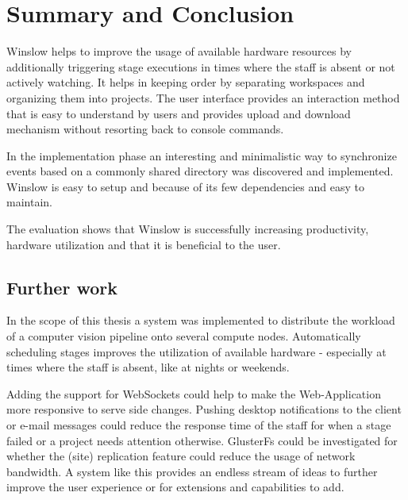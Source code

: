 \chapter{Summary and Conclusion}

Winslow helps to improve the usage of available hardware resources by additionally triggering stage executions in times where the staff is absent or not actively watching.
It helps in keeping order by separating workspaces and organizing them into projects.
The user interface provides an interaction method that is easy to understand by users and provides upload and download mechanism without resorting back to console commands.

In the implementation phase an interesting and minimalistic way to synchronize events based on a commonly shared directory was discovered and implemented.
Winslow is easy to setup and because of its few dependencies and easy to maintain.

The evaluation shows that Winslow is successfully increasing productivity, hardware utilization and that it is beneficial to the user.

\section{Further work}


In the scope of this thesis a system was implemented to distribute the workload of a computer vision pipeline onto several compute nodes.
Automatically scheduling stages improves the utilization of available hardware - especially at times where the staff is absent, like at nights or weekends.

Adding the support for WebSockets could help to make the Web-Application more responsive to serve side changes.
Pushing desktop notifications to the client or e-mail messages could reduce the response time of the staff for when a stage failed or a project needs attention otherwise.
GlusterFs could be investigated for whether the (site) replication feature could reduce the usage of network bandwidth.
A system like this provides an endless stream of ideas to further improve the user experience or for extensions and capabilities to add.